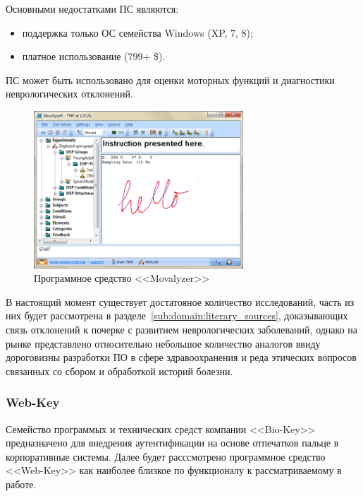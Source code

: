 Основными недостатками ПС являются:
\begin{itemize}
  \item поддержка только ОС семейства Windows (XP, 7, 8);
  \item платное использование (799+ \$).
\end{itemize}

ПС может быть использовано для оценки моторных функций и диагностики неврологических отклонений.

\begin{figure}[ht]
    \centering
    \includegraphics[width=0.7\textwidth]{figures/movalyzer.png}
    \caption{Программное средство <<Movalyzer>>}
    \label{fig:domain:analogs:movalyzer}
\end{figure}

В настоящий момент существует достатояное количество исследований, часть из них будет рассмотрена в разделе~\ref{sub:domain:literary_sources}, доказывающих связь отклонений к почерке с развитием неврологических заболеваний, однако на рынке представлено относительно небольшое количество аналогов ввиду дороговизны разработки ПО в сфере здравоохранения и реда этических вопросов связанных со сбором и обработкой историй болезни.

\subsubsection{Web-Key}
\label{sub:domain:analogs:biokey}
Семейство программых и технических средст компании <<Bio-Key>>~\cite{analogs_biokey} предназначено для внедрения аутентификации на основе отпечатков пальце в корпоративные системы. Далее будет расссмотрено программное средство <<Web-Key>> как наиболее близкое по функционалу к рассматриваемому в работе.

